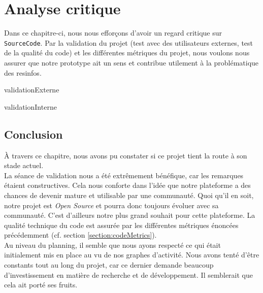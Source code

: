 \chapter{Analyse critique}
\label{section:validation}

Dans ce chapitre-ci, nous nous efforçons d'avoir un regard critique sur \texttt{SourceCode}. Par la validation du projet (test avec des utilisateurs externes, test de la qualité du code) et les différentes métriques du projet, nous voulons nous assurer que notre prototype ait un sens et contribue utilement à la problématique des \glspl{resinfo}.

{validationExterne}

{validationInterne}

\section{Conclusion}

À travers ce chapitre, nous avons pu constater si ce projet tient la route à son stade actuel.\\

La séance de validation nous a été extrêmement bénéfique, car les remarques étaient constructives. 
Cela nous conforte dans l'idée que notre plateforme a des chances de devenir mature et utilisable par une communauté. 
Quoi qu'il en soit, notre projet est \textit{Open Source} et pourra donc toujours évoluer avec sa communauté. 
C'est d'ailleurs notre plus grand souhait pour cette plateforme.
La qualité technique du code est assurée par les différentes métriques énoncées précédemment (cf. section \ref{section:codeMetrics}).\\

Au niveau du planning, il semble que nous ayons respecté ce qui était initialement mis en place au vu de nos graphes d'activité. 
Nous avons tenté d'être constants tout au long du projet, car ce dernier demande beaucoup d'investissement en matière de recherche et de développement. 
Il semblerait que cela ait porté ses fruits.